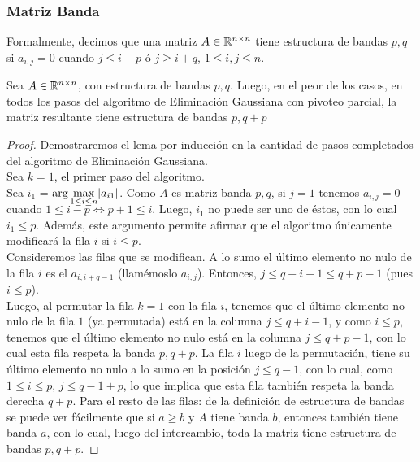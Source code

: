 \subsubsection{Matriz Banda}
Formalmente, decimos que una matriz $A \in \mathbb{R} ^{n\times n}$ tiene estructura de bandas $p,q$ si $a_{i,j} = 0$ cuando $j \leq i-p$ ó $j\geq i+q$, $1\leq i,j \leq n$.

\begin{lema}
Sea $A \in \mathbb{R}^{n \times n}$, con estructura de bandas $p, q$. Luego, en el peor de los casos, en todos los pasos del algoritmo de Eliminación Gaussiana con pivoteo parcial, la matriz resultante tiene estructura de bandas $p, q+p$
\end{lema}
\begin{proof}
Demostraremos el lema por inducción en la cantidad de pasos completados del algoritmo de Eliminación Gaussiana. \\
Sea $k = 1$, el primer paso del algoritmo.\\

Sea $i_1$ = $\smash{\displaystyle\arg\max_{1 \leq i \leq n}} |a_{i1}|$. Como $A$ es matriz banda $p, q$, si $j= 1$ tenemos $a_{i,j} = 0$ cuando $1 \leq i-p \Leftrightarrow p+1\leq i$. Luego, $i_1$ no puede ser uno de éstos, con lo cual $i_1 \leq p$. Además, este argumento permite afirmar que el algoritmo únicamente modificará la fila $i$ si $i\leq p$. \\

Consideremos las filas que se modifican. A lo sumo el último elemento no nulo de la fila $i$ es el $a_{i,i+q-1}$ (llamémoslo $a_{i,j}$). Entonces, $j \leq q+i-1 \leq q+p-1$ (pues $i \leq p$). \\

Luego, al permutar la fila $k = 1$ con la fila $i$, tenemos que el último elemento no nulo de la fila $1$ (ya permutada) está  en la columna $j \leq q+i-1$, y como $i \leq p$, tenemos que el último elemento no nulo está en la columna $j \leq q +p-1$, con lo cual esta fila respeta la banda $p, q+p$. La fila $i$ luego de la permutación, tiene su último elemento no nulo a lo sumo en la posición $j\leq q-1$, con lo cual, como $1\leq i\leq p$, $j \leq q-1+p$, lo que implica que esta fila también respeta la banda derecha $q+p$. Para el resto de las filas: de la definición de estructura de bandas se puede ver fácilmente que si $a \geq b$ y $A$ tiene banda $b$, entonces también tiene banda $a$, con lo cual, luego del intercambio, toda la matriz tiene estructura de bandas $p, q+p$.


\end{proof}
